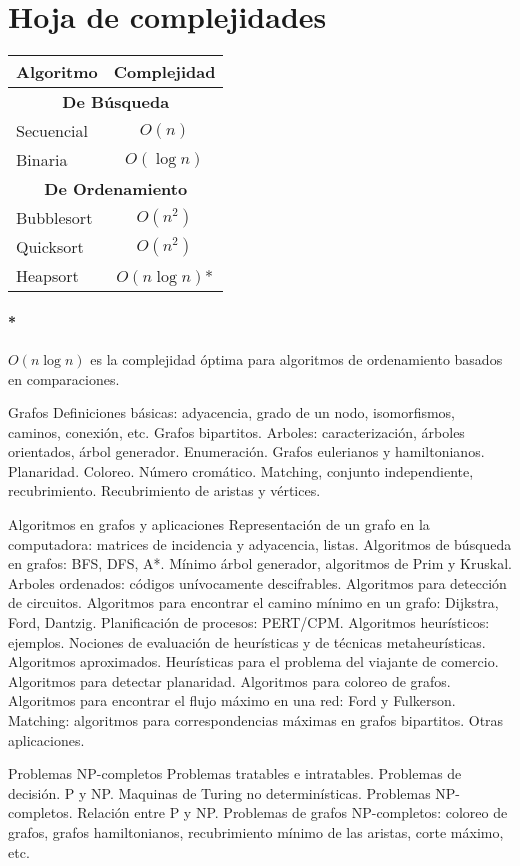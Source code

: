 \section{Hoja de complejidades}
\begin{center}
\begin{tabular}{|l|c|}
	\hline
	\textbf{Algoritmo} & \textbf{Complejidad} \\
	\hline
	\multicolumn{2}{|c|}{\cellcolor{blue!25}\textbf{De Búsqueda}}\\
	\hline
	Secuencial & \(O(n)\) \\
	\hline
	Binaria & \(O(\log{n})\) \\
	\hline
	\multicolumn{2}{|c|}{\cellcolor{blue!25}\textbf{De Ordenamiento}}\\
	\hline
	Bubblesort & \(O(n^2)\) \\
	\hline
	Quicksort & \(O(n^2)\) \\
	\hline
	Heapsort & \(O(n\log{n})\)* \\
	\hline
\end{tabular}
\end{center}

\paragraph{*} \(O(n\log{n})\) es la complejidad óptima para algoritmos de ordenamiento basados en comparaciones. 

\color{red}

Grafos Definiciones básicas: adyacencia, grado de un nodo, isomorfismos, caminos, conexión, etc. Grafos bipartitos. Arboles: caracterización, árboles orientados, árbol generador. Enumeración. Grafos eulerianos y hamiltonianos. Planaridad. Coloreo. Número cromático. Matching, conjunto independiente, recubrimiento. Recubrimiento de aristas y vértices.



Algoritmos en grafos y aplicaciones Representación de un grafo en la computadora: matrices de incidencia y adyacencia, listas. Algoritmos de búsqueda en grafos: BFS, DFS, A*. Mínimo árbol generador, algoritmos de Prim y Kruskal. Arboles ordenados: códigos unívocamente descifrables. Algoritmos para detección de circuitos. Algoritmos para encontrar el camino mínimo en un grafo: Dijkstra, Ford, Dantzig. Planificación de procesos: PERT/CPM. Algoritmos heurísticos: ejemplos. Nociones de evaluación de heurísticas y de técnicas metaheurísticas. Algoritmos aproximados. Heurísticas para el problema del viajante de comercio. Algoritmos para detectar planaridad. Algoritmos para coloreo de grafos. Algoritmos para encontrar el flujo máximo en una red: Ford y Fulkerson. Matching: algoritmos para correspondencias máximas en grafos bipartitos. Otras aplicaciones.



Problemas NP-completos Problemas tratables e intratables. Problemas de decisión. P y NP. Maquinas de Turing no determinísticas. Problemas NP-completos. Relación entre P y NP. Problemas de grafos NP-completos: coloreo de grafos, grafos hamiltonianos, recubrimiento mínimo de las aristas, corte máximo, etc.


